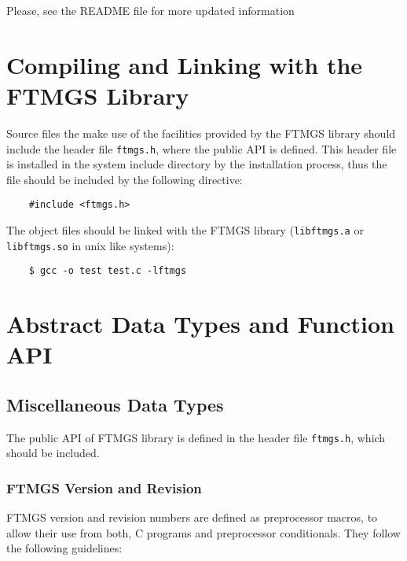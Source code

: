 \documentclass[a4paper]{article}
\begin{document}
Please, see the README file for more updated information

\section{Compiling and Linking with the FTMGS Library}

Source files the make use of the facilities provided by the FTMGS
library should include the header file \verb|ftmgs.h|, where the
public API is defined. This header file is installed in the system
include directory by the installation process, thus the file should be
included by the following directive:
\begin{verbatim}
    #include <ftmgs.h>
\end{verbatim}

The object files should be linked with the FTMGS library
(\verb|libftmgs.a| or \verb|libftmgs.so| in unix like systems):
\begin{verbatim}
    $ gcc -o test test.c -lftmgs
\end{verbatim}

\section{Abstract Data Types and Function API}

\subsection{Miscellaneous Data Types}

The public API of FTMGS library is defined in the header file
\verb|ftmgs.h|, which should be included.

\subsubsection*{FTMGS Version and Revision}

FTMGS version and revision numbers are defined as preprocessor macros,
to allow their use from both, C programs and preprocessor
conditionals. They follow the following guidelines:
\end{document}
